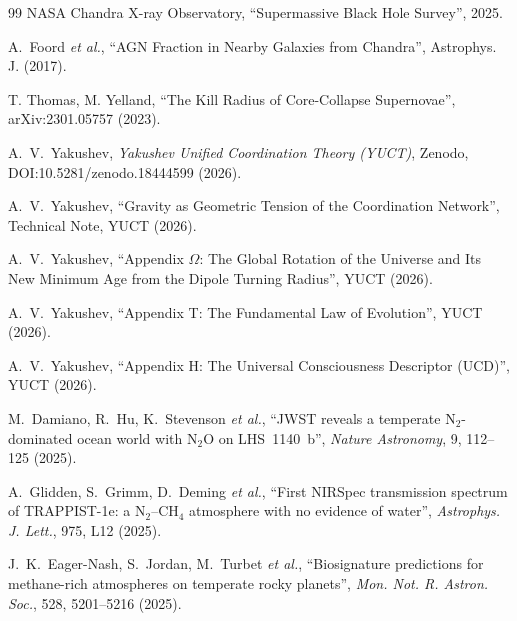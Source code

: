 \documentclass[12pt,a4paper]{article}
\begin{document}
	
	\begin{thebibliography}{99}
		NASA Chandra X-ray Observatory, ``Supermassive Black Hole Survey'', 2025.
		
		A.~Foord \emph{et al.}, ``AGN Fraction in Nearby Galaxies from Chandra'',
		Astrophys. J. (2017).
		
		T. Thomas, M. Yelland, ``The Kill Radius of Core-Collapse Supernovae'',
		arXiv:2301.05757 (2023).
		
		A.~V.~Yakushev, \emph{Yakushev Unified Coordination Theory (YUCT)},
		Zenodo, DOI:10.5281/zenodo.18444599 (2026).
		
		A.~V.~Yakushev, ``Gravity as Geometric Tension of the Coordination
		Network'', Technical Note, YUCT (2026).
		
		A.~V.~Yakushev, ``Appendix $\Omega$: The Global Rotation of the
		Universe and Its New Minimum Age from the Dipole Turning Radius'',
		YUCT (2026).
		
		A.~V.~Yakushev, ``Appendix T: The Fundamental Law of Evolution'',
		YUCT (2026).
		
		A.~V.~Yakushev, ``Appendix H: The Universal Consciousness Descriptor
		(UCD)'', YUCT (2026).
		
		M.~Damiano, R.~Hu, K.~Stevenson \emph{et al.},
		``JWST reveals a temperate N$_2$-dominated ocean world with N$_2$O
		on LHS~1140~b'', \emph{Nature Astronomy}, 9, 112--125 (2025).
		
		A.~Glidden, S.~Grimm, D.~Deming \emph{et al.},
		``First NIRSpec transmission spectrum of TRAPPIST-1e: a N$_2$--CH$_4$
		atmosphere with no evidence of water'', \emph{Astrophys. J. Lett.},
		975, L12 (2025).
		
		J.~K.~Eager-Nash, S.~Jordan, M.~Turbet \emph{et al.},
		``Biosignature predictions for methane-rich atmospheres on temperate
		rocky planets'', \emph{Mon. Not. R. Astron. Soc.}, 528, 5201--5216
		(2025).
	\end{thebibliography}
	
\end{document}
